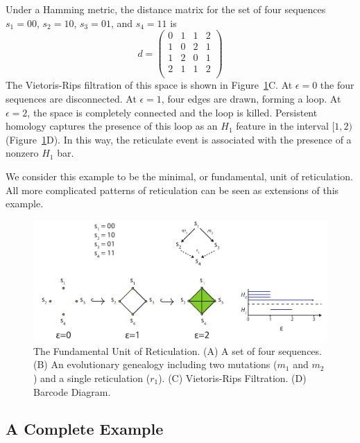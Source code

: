 Under a Hamming metric, the distance matrix for the set of four sequences $s_1=00$, $s_2=10$, $s_3=01$, and $s_4=11$ is
\begin{equation}
d = 
\begin{pmatrix}
0 & 1 & 1 & 2 \\
1 & 0 & 2 & 1 \\
1 & 2 & 0 & 1 \\
2 & 1 & 1 & 2 \\
\end{pmatrix}
\end{equation}
The Vietoris-Rips filtration of this space is shown in Figure~\ref{background:fig:four_gamete_test}C.
At $\epsilon=0$ the four sequences are disconnected.
At $\epsilon=1$, four edges are drawn, forming a loop.
At $\epsilon=2$, the space is completely connected and the loop is killed.
Persistent homology captures the presence of this loop as an $H_1$ feature in the interval $[1,2)$ (Figure~\ref{background:fig:four_gamete_test}D).
In this way, the reticulate event is associated with the presence of a nonzero $H_1$ bar.

We consider this example to be the minimal, or fundamental, unit of reticulation.
All more complicated patterns of reticulation can be seen as extensions of this example.

\begin{figure}
\centering
\includegraphics[width=\textwidth]{./fig/background/four_gamete_test.pdf}
\caption[Fundamental Unit of Reticulation]{The Fundamental Unit of Reticulation. (A) A set of four sequences. (B) An evolutionary genealogy including two mutations ($m_1$ and $m_2$) and a single reticulation ($r_1$). (C) Vietoris-Rips Filtration. (D) Barcode Diagram.}
\label{background:fig:four_gamete_test}
\end{figure}

\subsection{A Complete Example}
\label{bg:top4bio:full_example}

